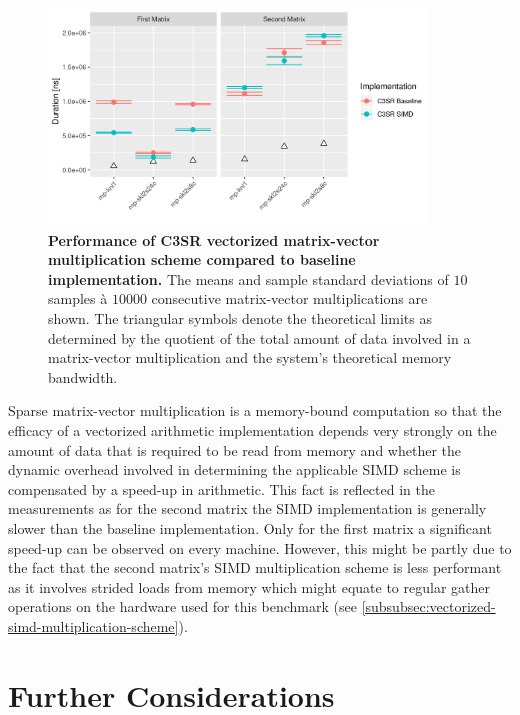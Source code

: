     \begin{figure}[!ht]
      \centering
      \includegraphics[width=0.9\textwidth]{assets/arithmetic_performance}
      \caption[Performance of C3SR vectorized matrix-vector multiplication scheme compared to baseline implementation.]{\textbf{Performance of C3SR vectorized matrix-vector multiplication scheme compared to baseline implementation.} The means and sample standard deviations of $10$ samples à $10000$ consecutive matrix-vector multiplications are shown. The triangular symbols denote the theoretical limits as determined by the quotient of the total amount of data involved in a matrix-vector multiplication and the system's theoretical memory bandwidth.}
      \label{fig:arithmetic-performance}
    \end{figure}

    Sparse matrix-vector multiplication is a memory-bound computation so that the efficacy of a vectorized arithmetic implementation depends very strongly on the amount of data that is required to be read from memory and whether the dynamic overhead involved in determining the applicable SIMD scheme is compensated by a speed-up in arithmetic. This fact is reflected in the measurements as for the second matrix the SIMD implementation is generally slower than the baseline implementation. Only for the first matrix a significant speed-up can be observed on every machine. However, this might be partly due to the fact that the second matrix's SIMD multiplication scheme is less performant as it involves strided loads from memory which might equate to regular gather operations on the hardware used for this benchmark (see \ref{subsubsec:vectorized-simd-multiplication-scheme}).

  \section{Further Considerations}


